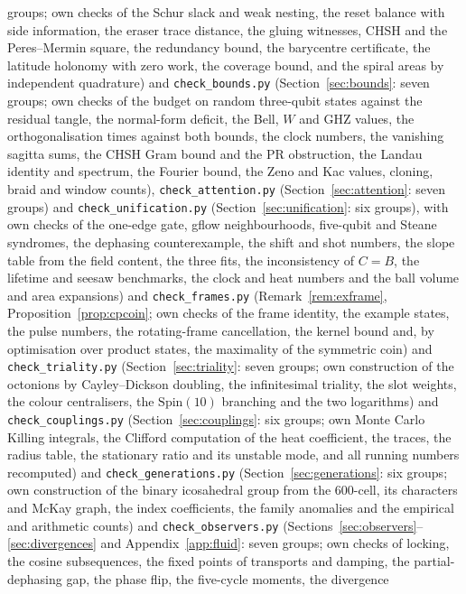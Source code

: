 \documentclass[aps,pra,onecolumn,superscriptaddress,nofootinbib,10pt]{revtex4-2}
\theoremstyle{definition}
\theoremstyle{remark}
\begin{document}
{groups; own checks of the Schur slack and weak nesting, the reset balance with side information, the
eraser trace distance, the gluing witnesses, CHSH and the Peres--Mermin square, the redundancy bound,
the barycentre certificate, the latitude holonomy with zero work, the coverage bound, and the spiral
areas by independent quadrature) and \texttt{check\_bounds.py} (Section~\ref{sec:bounds}: seven groups;
own checks of the budget on random three-qubit states against the residual tangle, the normal-form
deficit, the Bell, $W$ and GHZ values, the orthogonalisation times against both bounds, the clock numbers,
the vanishing sagitta sums, the CHSH Gram bound and the PR obstruction, the Landau identity and
spectrum, the Fourier bound, the Zeno and Kac values, cloning, braid and window counts), \texttt{check\_attention.py} (Section~\ref{sec:attention}: seven groups) and
\texttt{check\_unification.py} (Section~\ref{sec:unification}: six groups), with own checks of the one-edge gate,
gflow neighbourhoods, five-qubit and Steane syndromes, the dephasing counterexample, the shift and shot
numbers, the slope table from the field content, the three fits, the inconsistency of $C=B$, the lifetime
and seesaw benchmarks, the clock and heat numbers and the ball volume and area expansions) and \texttt{check\_frames.py} (Remark~\ref{rem:exframe},
Proposition~\ref{prop:cpcoin}; own checks of the frame identity, the example states, the pulse numbers, the
rotating-frame cancellation, the kernel bound and, by optimisation over product states, the maximality
of the symmetric coin) and \texttt{check\_triality.py} (Section~\ref{sec:triality}: seven groups;
own construction of the octonions by Cayley--Dickson doubling, the infinitesimal triality, the slot
weights, the colour centralisers, the $\mathrm{Spin}(10)$ branching and the two logarithms) and \texttt{check\_couplings.py} (Section~\ref{sec:couplings}: six groups; own Monte Carlo Killing
integrals, the Clifford computation of the heat coefficient, the traces, the radius table, the stationary
ratio and its unstable mode, and all running numbers recomputed) and \texttt{check\_generations.py} (Section~\ref{sec:generations}: six groups; own
construction of the binary icosahedral group from the $600$-cell, its characters and McKay graph, the index
coefficients, the family anomalies and the empirical and arithmetic counts) and \texttt{check\_observers.py} (Sections~\ref{sec:observers}--\ref{sec:divergences} and
Appendix~\ref{app:fluid}: seven groups; own checks of locking, the cosine subsequences, the fixed points of
transports and damping, the partial-dephasing gap, the phase flip, the five-cycle moments, the divergence
}
\end{document}

